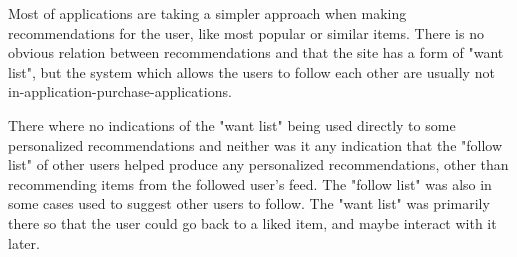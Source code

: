     Most of applications are taking a simpler approach when making recommendations for the user, like most popular or similar items.
    There is no obvious relation between recommendations and that the site has a form of "want list", but the system which allows the users to follow each other are usually not in-application-purchase-applications.

    There where no indications of the "want list" being used directly to some personalized recommendations and neither was it any indication that the "follow list" of other users helped produce any personalized recommendations, other than recommending items from the followed user's feed.
    The "follow list" was also in some cases used to suggest other users to follow.
    The "want list" was primarily there so that the user could go back to a liked item, and maybe interact with it later.
